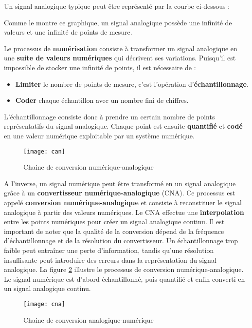Un signal analogique typique peut être représenté par la courbe ci-dessous :

\begin{center}
\end{center}

Comme le montre ce graphique, un signal analogique possède une infinité de 
valeurs et une infinité de points de mesure.


Le processus de \textbf{numérisation} consiste à transformer un signal analogique 
en une \textbf{suite de valeurs numériques} qui décrivent ses variations. 
Puisqu'il est impossible de stocker une infinité de points, il est nécessaire de :
\begin{itemize}
    \item \textbf{Limiter} le nombre de points de mesure, c'est l’opération d’\textbf{échantillonnage}.
    \item \textbf{Coder} chaque échantillon avec un nombre fini de chiffres.
\end{itemize}


L’échantillonnage consiste donc à prendre un certain nombre de points 
représentatifs du signal analogique. Chaque point est ensuite \textbf{quantifié} 
et \textbf{codé} en une valeur numérique exploitable par un système numérique.
\begin{figure}[H]
    \centering
    \texttt{[image: can]}
    \caption{Chaine de conversion numérique-analogique}
    \label{fig:cna}
\end{figure}

A l’inverse, un signal numérique peut être transformé en un signal analogique 
grâce à un \textbf{convertisseur numérique-analogique} (CNA). Ce processus est
appelé \textbf{conversion numérique-analogique} et consiste à reconstituer le
signal analogique à partir des valeurs numériques. Le CNA effectue une
\textbf{interpolation} entre les points numériques pour créer un signal analogique
continu. Il est important de noter que la qualité de la conversion dépend de la
fréquence d'échantillonnage et de la résolution du convertisseur. Un échantillonnage
trop faible peut entraîner une perte d'information, tandis qu'une résolution
insuffisante peut introduire des erreurs dans la représentation du signal
analogique. La figure \ref{fig:chaine-cna} illustre le processus de conversion
numérique-analogique. Le signal numérique est d'abord échantillonné, puis
quantifié et enfin converti en un signal analogique continu.
\begin{figure}[H]
    \centering
    \texttt{[image: cna]}
    \caption{Chaine de conversion analogique-numérique}
    \label{fig:chaine-cna}
\end{figure}

